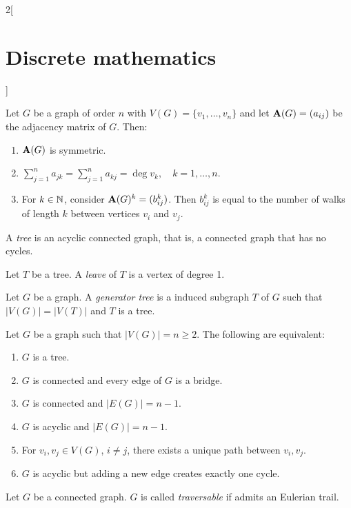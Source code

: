 \documentclass[../../../main.tex]{subfiles}
\begin{document}
\begin{multicols}{2}[\section{Discrete mathematics}]
\begin{definition}
    \end{definition}
    \begin{prop}
        Let $G$ be a graph of order $n$ with $V(G)=\{v_1,\ldots,v_n\}$ and let $\boldsymbol{\mathrm{A}}(G)=(a_{ij})$ be the adjacency matrix of $G$. Then:
        \begin{enumerate}
            \item $\boldsymbol{\mathrm{A}}(G)$ is symmetric.
            \item $\displaystyle\sum_{j=1}^n a_{jk}=\sum_{j=1}^n a_{kj}=\deg v_k,\quad k=1,\ldots,n$.
            \item For $k\in\mathbb{N} $, consider $\boldsymbol{\mathrm{A}}(G)^k=(b_{ij}^k)$. Then $b_{ij}^k$ is equal to the number of walks of length $k$ between vertices $v_i$ and $v_j$.
        \end{enumerate}
    \end{prop}
    \begin{definition}
        A \textit{tree} is an acyclic connected graph, that is, a connected graph that has no cycles.
    \end{definition}
    \begin{definition}
        Let $T$ be a tree. A \textit{leave} of $T$ is a vertex of degree 1.
    \end{definition}
    \begin{definition}
        Let $G$ be a graph. A \textit{generator tree} is a induced subgraph $T$ of $G$ such that $|V(G)|=|V(T)|$ and $T$ is a tree.
    \end{definition}
    \begin{prop}
        Let $G$ be a graph such that $|V(G)|=n\geq 2$. The following are equivalent:
        \begin{enumerate}
            \item $G$ is a tree.
            \item $G$ is connected and every edge of $G$ is a bridge.
            \item $G$ is connected and $|E(G)|=n-1$.
            \item $G$ is acyclic and $|E(G)|=n-1$.
            \item For $v_i,v_j\in V(G)$, $i\ne j$, there exists a unique path between $v_i,v_j$.
            \item $G$ is acyclic but adding a new edge creates exactly one cycle.
        \end{enumerate}
    \end{prop}
    \begin{definition}
        Let $G$ be a connected graph. $G$ is called \textit{traversable} if admits an Eulerian trail.

\end{definition}
\end{multicols}
\end{document}
